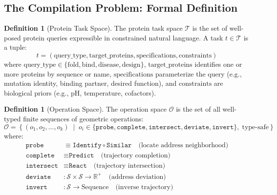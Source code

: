 \documentclass[11pt,twocolumn,a4paper]{article}
\theoremstyle{definition}
\newtheorem{definition}[theorem]{Definition}
\theoremstyle{remark}
\newcommand{\Sspace}{\mathcal{S}}
\newcommand{\R}{\mathbb{R}}
\newcommand{\taskspace}{\mathcal{T}}
\newcommand{\opspace}{\mathcal{O}}
\begin{document}
\subsection{The Compilation Problem: Formal Definition}

\begin{definition}[Protein Task Space]
\label{def:task_space}
The protein task space $\taskspace$ is the set of well-posed protein queries expressible in constrained natural language. A task $t \in \taskspace$ is a tuple:
\begin{equation}
t = (\text{query\_type}, \text{target\_proteins}, \text{specifications}, \text{constraints})
\end{equation}
where $\text{query\_type} \in \{\text{fold}, \text{bind}, \text{disease}, \text{design}\}$, $\text{target\_proteins}$ identifies one or more proteins by sequence or name, $\text{specifications}$ parameterize the query (e.g., mutation identity, binding partner, desired function), and $\text{constraints}$ are biological priors (e.g., pH, temperature, cofactors).
\end{definition}

\begin{definition}[Operation Space]
\label{def:operation_space}
The operation space $\opspace$ is the set of all well-typed finite sequences of geometric operations:
\begin{equation}
\opspace = \left\{ (o_1, o_2, \ldots, o_k) \;\middle|\; o_i \in \{\texttt{probe}, \texttt{complete}, \texttt{intersect}, \texttt{deviate}, \texttt{invert}\}, \; \text{type-safe} \right\}
\end{equation}
where:
\begin{align}
\texttt{probe} &\equiv \texttt{Identify} \circ \texttt{Similar} \quad \text{(locate address neighborhood)} \\
\texttt{complete} &\equiv \texttt{Predict} \quad \text{(trajectory completion)} \\
\texttt{intersect} &\equiv \texttt{React} \quad \text{(trajectory intersection)} \\
\texttt{deviate} &: \Sspace \times \Sspace \to \R^+ \quad \text{(address deviation)} \\
\texttt{invert} &: \Sspace \to \text{Sequence} \quad \text{(inverse trajectory)}
\end{align}
\end{definition}
\end{document}

